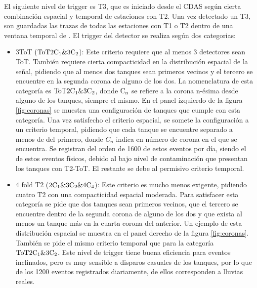 			 El siguiente nivel de trigger es T3, que es iniciado desde el CDAS seg\'un cierta combinaci\'on espacial y temporal de estaciones con T2.
			Una vez detectado un T3, son guardadas las trazas de todas las estaciones con T1 o T2 dentro de una ventana temporal de .
			El trigger del detector se realiza seg\'un dos categorias:
			
			\begin{itemize}
			\item 3ToT ($\rm ToT2C_1\&3C_2$): Este criterio requiere que al menos 3 detectores sean ToT. Tambi\'en requiere cierta compacticidad en la distribuci\'on espacial de la se\~nal, pidiendo que al menos dos tanques sean primeros vecinos y el tercero se encuentre en la segunda corona de alguno de los dos. La nomenclatura de esta categor\'ia es $\rm ToT2C_1\&3C_2$, donde $\rm C_n$ se refiere a la corona n-\'esima desde alguno de los tanques, siempre el mismo. En el panel izquierdo de la figura \ref{fig:coronas} se muestra una configuraci\'on de tanques que cumple con esta categor\'ia. Una vez satisfecho el criterio espacial, se somete la configuraci\'on a un criterio temporal, pidiendo que cada tanque se encuentre separado a menos de  del primero, donde $C_n$ indica en n\'umero de corona en el que se encuentra. Se registran del orden de 1600 de estos eventos por d\'ia, siendo el  de estos eventos f\'isicos, debido al bajo nivel de contaminaci\'on que presentan los tanques con T2-ToT. El  restante se debe al permisivo criterio temporal.
			\item 4 fold T2 ($\rm2C_1\&3C_2\&4C_4$): Este criterio es mucho menos exigente, pidiendo cuatro T2 con una compacticidad espacial moderada. Para satisfacer esta categor\'ia se pide que dos tanques sean primeros vecinos, que el tercero se encuentre dentro de la segunda corona de alguno de los dos y que exista al menos un tanque m\'as en la cuarta corona del anterior. Un ejemplo de esta distribuci\'on espacial se muestra en el panel derecho de la figura \ref{fig:coronas}. Tambi\'en se pide el mismo criterio temporal que para la categor\'ia $\rm ToT2C_1\&3C_2$. Este nivel de trigger tiene buena eficiencia para eventos inclinados, pero es muy sensible a disparos casuales de los tanques, por lo que de los 1200 eventos registrados diariamente,  de ellos corresponden a lluvias reales.
			\end{itemize}
			
